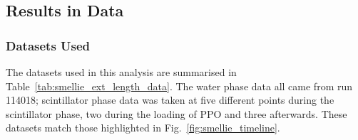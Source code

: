 





\subsection{Results in Data}
\subsubsection{Datasets Used}
The datasets used in this analysis are summarised in Table~\ref{tab:smellie_ext_length_data}. The water phase data all came from run \num{114018}; scintillator phase data was taken at five different points during the scintillator phase, two during the loading of PPO and three afterwards. These datasets match those highlighted in Fig.~\ref{fig:smellie_timeline}.

